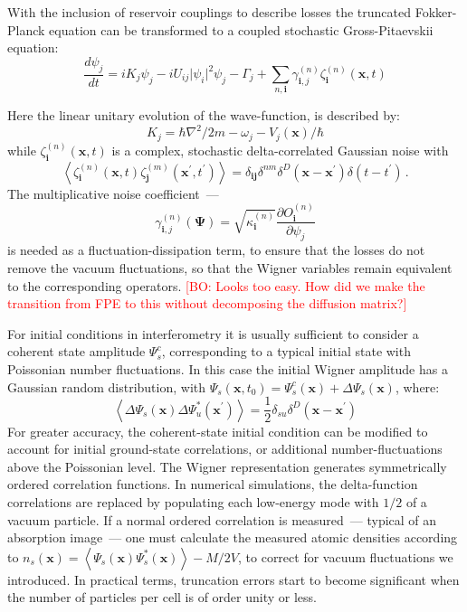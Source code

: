 \documentclass[aps,prl,twocolumn,showpacs,amsmath,amssymb,superscriptaddress]{revtex4-1}
\newcommand{\bogdansremark}[1]{\textcolor{red}{{[}BO: #1{]}}}
\newcommand{\xvec}{\boldsymbol{x}}
\newcommand{\ivec}{\boldsymbol{i}}
\newcommand{\jvec}{\boldsymbol{j}}
\newcommand{\Psivec}{\boldsymbol{\Psi}}
\begin{document}
With the inclusion of reservoir couplings to describe losses
the truncated Fokker-Planck equation can be transformed
to a coupled stochastic Gross-Pitaevskii equation:
\begin{equation}
	\frac{d\psi_{j}}{dt} = iK_{j} \psi_{j} - iU_{ij} \lvert \psi_{i} \rvert ^{2} \psi_{j} -
	\Gamma_{j} + \sum_{n,\ivec} \gamma_{\ivec,j}^{(n)} \zeta_{\ivec}^{(n)} (\xvec,t)
\end{equation}

Here the linear unitary evolution of the wave-function, is described by:
\begin{equation}
	K_{j} = \hbar \nabla^{2}/2m - \omega_{j} - V_{j} \left( \xvec \right) / \hbar
\end{equation}
while $\zeta_{\ivec}^{(n)}(\xvec, t)$ is a complex,
stochastic delta-correlated Gaussian noise with
\begin{equation}
	\left\langle
		\zeta_{\ivec}^{(n)} (\xvec,t) \zeta_{\jvec}^{(m)}(\xvec^\prime, t^\prime)
	\right\rangle =
	\delta_{\ivec \jvec} \delta^{nm} \delta^{D} \left(
		\xvec - \xvec^\prime
	\right)
	\delta \left( t - t^\prime \right)\,.
\end{equation}
The multiplicative noise coefficient~---
\begin{equation}
	\gamma_{\ivec,j}^{(n)} \left( \Psivec \right) =
	\sqrt{\kappa_{\ivec}^{(n)}}
	\frac{\partial O_{\ivec}^{(n)}}{\partial\psi_{j}}
\end{equation}
is needed as a fluctuation-dissipation term,
to ensure that the losses do not remove the vacuum fluctuations,
so that the Wigner variables remain equivalent to the corresponding operators.
	\bogdansremark{Looks too easy. How did we make the transition from FPE to this
	without decomposing the diffusion matrix?}

For initial conditions in interferometry it is usually sufficient
to consider a coherent state amplitude $\Psi_{s}^{c}$,
corresponding to a typical initial state with Poissonian number fluctuations.
In this case the initial Wigner amplitude has a Gaussian random distribution,
with $\Psi_{s}(\xvec,t_{0})=\Psi_{s}^{c}(\xvec)+\Delta\Psi_{s}(\xvec)$,
where:
\begin{equation}
	\left\langle
		\Delta\Psi_{s}(\xvec) \Delta\Psi_{u}^{*}(\xvec^\prime)
	\right\rangle =
	\frac{1}{2} \delta_{su} \delta^{D} \left( \xvec - \xvec^\prime\right)
\end{equation}
For greater accuracy, the coherent-state initial condition
can be modified to account for initial ground-state correlations,
or additional number-fluctuations above the Poissonian level.
The Wigner representation generates symmetrically ordered correlation functions.
In numerical simulations, the delta-function correlations are replaced by
populating each low-energy mode with $1/2$ of a vacuum particle.
If a normal ordered correlation is measured~--- typical of an absorption image~---
one must calculate the measured atomic densities according to
$n_{s} \left( \xvec \right) = \left\langle
	\Psi_{s}(\xvec) \Psi_{s}^{*}(\xvec)
\right\rangle - M / 2V$,
to correct for vacuum fluctuations we introduced.
In practical terms, truncation errors start to become significant
when the number of particles per cell is of order unity or less.
\end{document}
